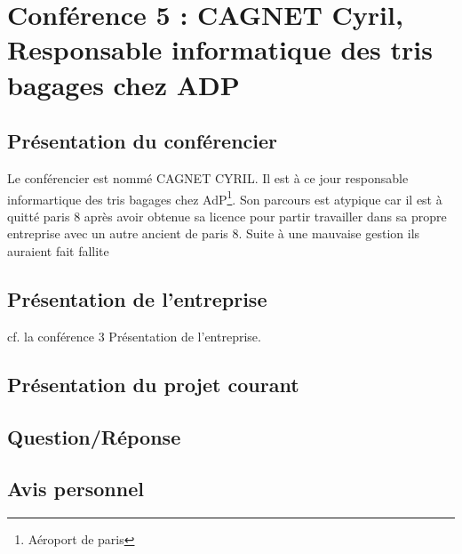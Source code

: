 \section{Conférence 5 : CAGNET Cyril, Responsable informatique des tris bagages chez ADP}
 	\subsection{Présentation du conférencier}
 Le conférencier est  nommé CAGNET CYRIL. Il est à ce jour responsable informartique des tris bagages chez AdP\footnote{Aéroport de paris}. Son parcours est atypique car il est à quitté paris 8 après avoir obtenue sa licence pour partir travailler dans sa propre entreprise avec un autre ancient de paris 8. Suite à une mauvaise gestion ils auraient fait fallite  
 	\subsection{Présentation de l'entreprise}
 	cf. la conférence 3 Présentation de l'entreprise. 
 	\subsection{Présentation du projet courant}
 	\subsection{Question/Réponse}
 	\subsection{Avis personnel} 